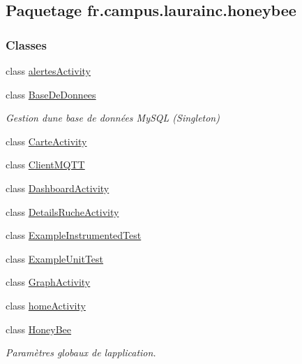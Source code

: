\hypertarget{namespacefr_1_1campus_1_1laurainc_1_1honeybee}{}\subsection{Paquetage fr.\+campus.\+laurainc.\+honeybee}
\label{namespacefr_1_1campus_1_1laurainc_1_1honeybee}
\subsubsection*{Classes}
\begin{DoxyCompactItemize}
\item 
class \hyperlink{classfr_1_1campus_1_1laurainc_1_1honeybee_1_1alertes_activity}{alertes\+Activity}
\item 
class \hyperlink{classfr_1_1campus_1_1laurainc_1_1honeybee_1_1_base_de_donnees}{Base\+De\+Donnees}
\begin{DoxyCompactList}\small\item\em Gestion d\textquotesingle{}une base de données My\+S\+QL (Singleton) \end{DoxyCompactList}\item 
class \hyperlink{classfr_1_1campus_1_1laurainc_1_1honeybee_1_1_carte_activity}{Carte\+Activity}
\item 
class \hyperlink{classfr_1_1campus_1_1laurainc_1_1honeybee_1_1_client_m_q_t_t}{Client\+M\+Q\+TT}
\item 
class \hyperlink{classfr_1_1campus_1_1laurainc_1_1honeybee_1_1_dashboard_activity}{Dashboard\+Activity}
\item 
class \hyperlink{classfr_1_1campus_1_1laurainc_1_1honeybee_1_1_details_ruche_activity}{Details\+Ruche\+Activity}
\item 
class \hyperlink{classfr_1_1campus_1_1laurainc_1_1honeybee_1_1_example_instrumented_test}{Example\+Instrumented\+Test}
\item 
class \hyperlink{classfr_1_1campus_1_1laurainc_1_1honeybee_1_1_example_unit_test}{Example\+Unit\+Test}
\item 
class \hyperlink{classfr_1_1campus_1_1laurainc_1_1honeybee_1_1_graph_activity}{Graph\+Activity}
\item 
class \hyperlink{classfr_1_1campus_1_1laurainc_1_1honeybee_1_1home_activity}{home\+Activity}
\item 
class \hyperlink{classfr_1_1campus_1_1laurainc_1_1honeybee_1_1_honey_bee}{Honey\+Bee}
\begin{DoxyCompactList}\small\item\em Paramètres globaux de l\textquotesingle{}application. \end{DoxyCompactList}\item 

\end{DoxyCompactItemize}
